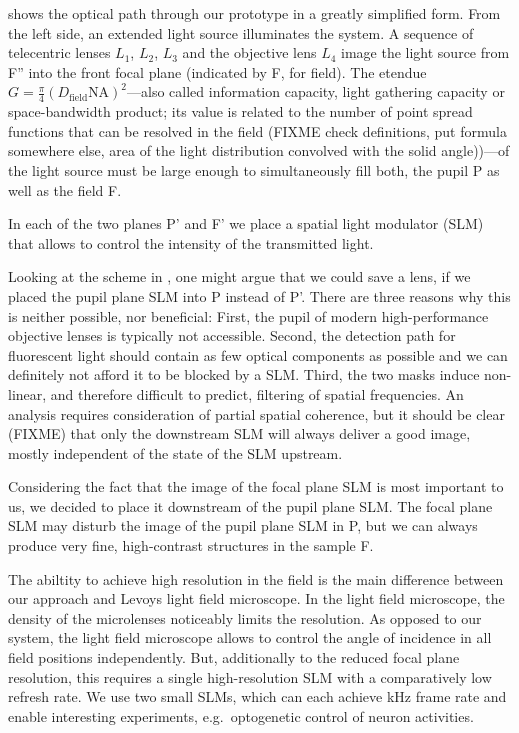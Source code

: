  shows the optical path through our prototype
in a greatly simplified form.  From the left side, an extended light
source illuminates the system. A sequence of telecentric lenses $L_1$,
$L_2$, $L_3$ and the objective lens $L_4$ image the light source from
F'' into the front focal plane (indicated by F, for field). The
etendue $G=\frac{\pi}{4}(D_\textrm{field}\textrm{NA})^2$---also called
information capacity, light gathering capacity or space-bandwidth
product; its value is related to the number of point spread functions
that can be resolved in the field (FIXME check definitions, put
formula somewhere else, area of the light distribution convolved with
the solid angle))---of the light source must be large enough to
simultaneously fill both, the pupil P as well as the field F.

In each of the two planes P' and F' we place a spatial light modulator
(SLM) that allows to control the intensity of the transmitted light.

Looking at the scheme in , one might argue
that we could save a lens, if we placed the pupil plane SLM into P
instead of P'. There are three reasons why this is neither possible,
nor beneficial: First, the pupil of modern high-performance objective
lenses is typically not accessible. Second, the detection path for
fluorescent light should contain as few optical components as possible
and we can definitely not afford it to be blocked by a SLM.  Third,
the two masks induce non-linear, and therefore difficult to predict,
filtering of spatial frequencies. An analysis requires consideration
of partial spatial coherence, but it should be clear (FIXME) that only
the downstream SLM will always deliver a good image, mostly
independent of the state of the SLM upstream.

Considering the fact that the image of the focal plane SLM is most
important to us, we decided to place it downstream of the pupil plane
SLM. The focal plane SLM may disturb the image of the pupil plane SLM
in P, but we can always produce very fine, high-contrast structures in
the sample F.

The abiltity to achieve high resolution in the field is the main
difference between our approach and Levoys light field microscope.  In
the light field microscope, the density of the microlenses noticeably
limits the resolution. As opposed to our system, the light field
microscope allows to control the angle of incidence in all field
positions independently.  But, additionally to the reduced focal plane
resolution, this requires a single high-resolution SLM with a
comparatively low refresh rate. We use two small SLMs, which can each
achieve \unit[1]{kHz} frame rate and enable interesting experiments,
e.g.\ optogenetic control of neuron activities.

